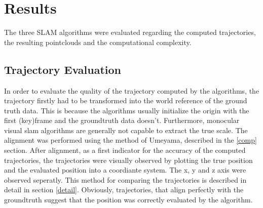 \section{Results}

The three SLAM algorithms were evaluated regarding the computed trajectories, the resulting pointclouds and
the computational complexity. 

\subsection{Trajectory Evaluation}

	In order to evaluate the quality of the trajectory computed by the algorithms, the trajectory firstly had to be 
	transformed into the world reference of the ground truth data. This is because the algorithms usually initialize
	the origin with the first (key)frame and the groundtruth data doesn't. Furthermore, monocular visual slam algorithms 
	are generally not capable to extract the true scale. The alignment was performed using the method of Umeyama, described
	in the \ref{comp} section. 
	After alignment, as a first indicator for the accuracy of the computed trajectories, the trajectories were visually observed by 
	plotting the true position and the evaluated position into a coordiante system. The x, y and z axis were observed seperatly. This method 
    for comparing the trajectories is described in detail in section \ref{detail}. Obviously, trajectories, that align perfectly with the groundtruth
	suggest that the position was correctly evaluated by the algorithm. 
	

